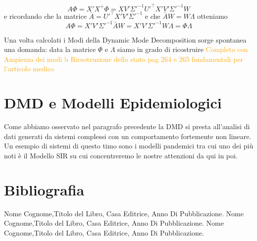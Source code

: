 \documentclass[11pt]{article}
\begin{document}
$$A \Phi = X'X^+ \Phi = X V' \Sigma'^{-1} U'^\top X'V'\Sigma'^{-1}W $$ e ricordando che la matrice $\bar{A} =  U'^\top X' V' \Sigma'^{-1}$ e che $\bar{A} W = W \Lambda$ otteniamo
$$ A \Phi = X'V'\Sigma'^{-1} \bar{A}  W = X'V'\Sigma'^{-1} W \Lambda  = \Phi \Lambda $$

Una volta calcolati i Modi della Dynamic Mode Decomposition sorge spontanea una domanda: data la matrice $\Phi$ e $\Lambda$ siamo in grado di ricostruire 
\textcolor{orange}{
Completo con 
Ampiezza dei modi b
Ricsotruzione dello stato pag 264 e 265 fondamentali per l'articolo medico
}
\section{DMD e Modelli Epidemiologici}
Come abbiamo osservato nel paragrafo precedente la DMD si presta all'analisi di dati generati da sistemi complessi con un comportamento fortemente non lineare. Un esempio di sistemi di questo timo sono i modelli pandemici tra cui uno dei più noti è il Modello SIR su cui concentreremo le nostre attenzioni da qui in poi.  


\newpage
\section{Bibliografia}
\begin{thebibliography}{99}
 Nome Cognome,Titolo del Libro, Casa Editrice, Anno Di Pubblicazione.
 Nome Cognome,Titolo del Libro, Casa Editrice, Anno Di Pubblicazione.
 Nome Cognome,Titolo del Libro, Casa Editrice, Anno Di Pubblicazione.
\end{thebibliography}

\printindex
\end{document}

